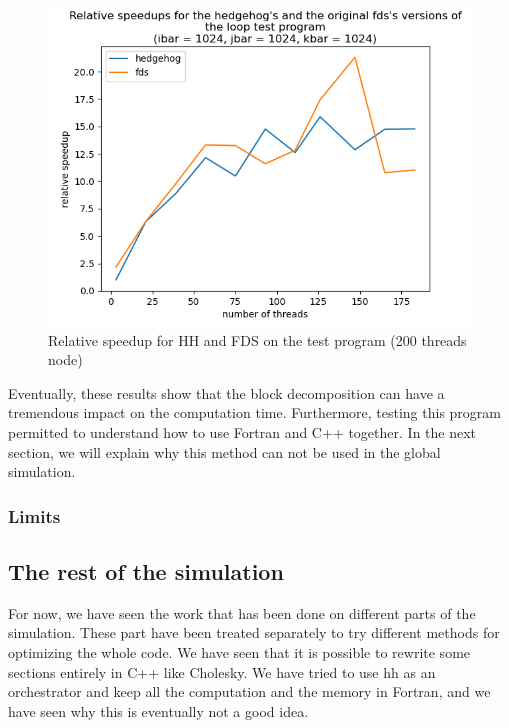 \begin{figure}[ht!]
  \begin{center}
    \includegraphics[scale=0.6]{img/fds-loops/relative_speedup.png}
    \caption{Relative speedup for HH and FDS on the test program (200 threads node)}
    \label{fig:loopsrelativespeedup}
  \end{center}
\end{figure}

Eventually, these results show that the block decomposition can have a
tremendous impact on the computation time. Furthermore, testing this program
permitted to understand how to use Fortran and C++ together. In the next
section, we will explain why this method can not be used in the global
simulation.

\subsubsection{Limits}


\subsection{The rest of the simulation}

For now, we have seen the work that has been done on different parts of the
simulation. These part have been treated separately to try different methods for
optimizing the whole code. We have seen that it is possible to rewrite some
sections entirely in C++ like Cholesky. We have tried to use \gls{hh} as an
orchestrator and keep all the computation and the memory in Fortran, and we have
seen why this is eventually not a good idea.

